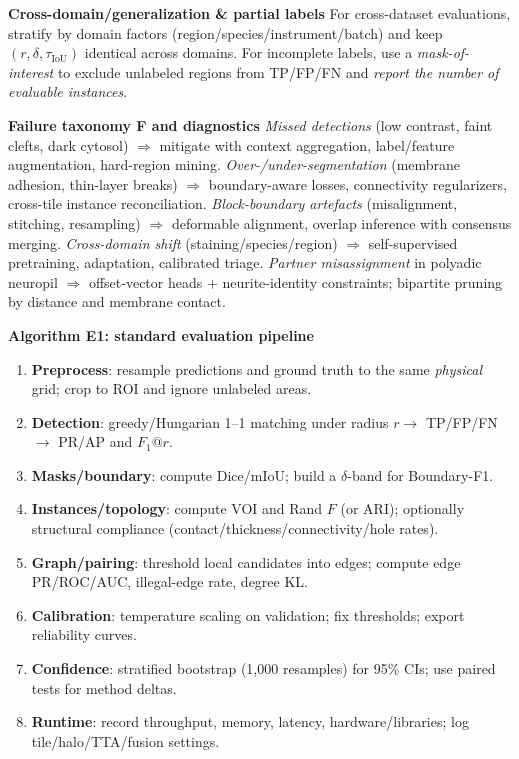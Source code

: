 \medskip
\noindent\textbf{Cross-domain/generalization \& partial labels}\;
For cross-dataset evaluations, stratify by domain factors (region/species/instrument/batch) and keep \((r,\delta,\tau_{\mathrm{IoU}})\) identical across domains.
For incomplete labels, use a \emph{mask-of-interest} to exclude unlabeled regions from TP/FP/FN and \emph{report the number of evaluable instances}.

\medskip
\noindent\textbf{Failure taxonomy F and diagnostics}\;
\emph{Missed detections} (low contrast, faint clefts, dark cytosol) \(\Rightarrow\) mitigate with context aggregation, label/feature augmentation, hard-region mining.  
\emph{Over-/under-segmentation} (membrane adhesion, thin-layer breaks) \(\Rightarrow\) boundary-aware losses, connectivity regularizers, cross-tile instance reconciliation.  
\emph{Block-boundary artefacts} (misalignment, stitching, resampling) \(\Rightarrow\) deformable alignment, overlap inference with consensus merging.  
\emph{Cross-domain shift} (staining/species/region) \(\Rightarrow\) self-supervised pretraining, adaptation, calibrated triage.  
\emph{Partner misassignment} in polyadic neuropil \(\Rightarrow\) offset-vector heads \(+\) neurite-identity constraints; bipartite pruning by distance and membrane contact.  

\medskip
\noindent\textbf{Algorithm E1: standard evaluation pipeline}\;
\begin{enumerate}
  \item \textbf{Preprocess}:\; resample predictions and ground truth to the same \emph{physical} grid; crop to ROI and ignore unlabeled areas.
  \item \textbf{Detection}:\; greedy/Hungarian 1--1 matching under radius \(r\)\(\to\) TP/FP/FN \(\to\) PR/AP and \(F_1@r\).
  \item \textbf{Masks/boundary}:\; compute Dice/mIoU; build a \(\delta\)-band for Boundary-F1.
  \item \textbf{Instances/topology}:\; compute VOI and Rand \(F\) (or ARI); optionally structural compliance (contact/thickness/connectivity/hole rates).
  \item \textbf{Graph/pairing}:\; threshold local candidates into edges; compute edge PR/ROC/AUC, illegal-edge rate, degree KL.
  \item \textbf{Calibration}:\; temperature scaling on validation; fix thresholds; export reliability curves.
  \item \textbf{Confidence}:\; stratified bootstrap (1{,}000 resamples) for 95\% CIs; use paired tests for method deltas.
  \item \textbf{Runtime}:\; record throughput, memory, latency, hardware/libraries; log tile/halo/TTA/fusion settings.
\end{enumerate}

